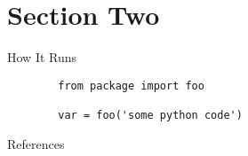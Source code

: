 \documentclass[t]{beamer}
\begin{document}
\section{Section Two}
\begin{frame}[c, fragile]{How It Runs}
    \begin{verbatim}
        from package import foo

		var = foo('some python code')
\end{verbatim}
\end{frame}

\begin{frame}{References}
    \printbibliography
\end{frame}
\end{document}
